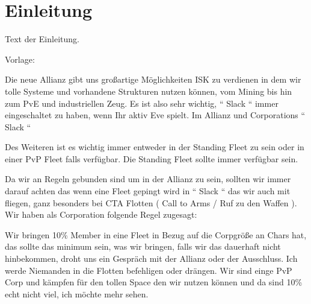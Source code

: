 \section{Einleitung}
Text der Einleitung.

Vorlage: 

Die neue Allianz gibt uns großartige Möglichkeiten ISK zu verdienen in dem wir tolle Systeme und
vorhandene Strukturen nutzen können, vom Mining bis hin zum PvE und industriellen Zeug.
Es ist also sehr wichtig, “ Slack “ immer eingeschaltet zu haben, wenn Ihr aktiv Eve spielt.
Im Allianz und Corporations “ Slack “

Des Weiteren ist es wichtig immer entweder in der Standing Fleet zu sein oder in einer PvP Fleet
falls verfügbar. Die Standing Fleet sollte immer verfügbar sein. 

Da wir an Regeln gebunden sind um in der Allianz zu sein, sollten wir immer darauf achten das
wenn eine Fleet gepingt wird in “ Slack “ das wir auch mit fliegen, ganz besonders bei CTA Flotten
( Call to Arms / Ruf zu den Waffen ). Wir haben als Corporation folgende Regel zugesagt:

Wir bringen 10\% Member in eine Fleet in Bezug auf die Corpgröße an Chars hat, das sollte das
minimum sein, was wir bringen, falls wir das dauerhaft nicht hinbekommen, droht uns ein Gespräch mit der Allianz oder der Ausschluss. Ich werde Niemanden in die Flotten befehligen oder drängen.
Wir sind einge PvP Corp und kämpfen für den tollen Space den wir nutzen können und da sind
10\% echt nicht viel, ich möchte mehr sehen.

